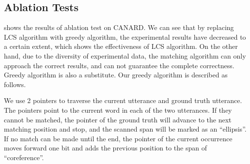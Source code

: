 \subsection{Ablation Tests}
\label{sec:ablation}

\begin{table}[ht!]
\setlength\tabcolsep{3pt}
\centering
\scriptsize
\caption{
Ablation test on CANARD. ``w/o LCS'' means replace LCS algorithm with a greedy algorithm. ``w/o split'' and ``w/o hint'' respectively represent removing the 2 kinds of optimizations in .}
\label{tab:ablation}
\end{table}

 shows the results of ablation test on CANARD. We can see that by replacing LCS algorithm with greedy algorithm, the experimental results have decreased to a certain extent, which shows the effectiveness of LCS algorithm. On the other hand, due to the diversity of experimental data, the matching algorithm can only approach the correct results, and can not guarantee the complete correctness. Greedy algorithm is also a substitute. Our greedy algorithm is described as follows.

We use 2 pointers to traverse the current utterance and ground truth utterance. The pointers point to the current word in each of the two utterances. If they cannot be matched, the pointer of the ground truth will advance to the next matching position and stop, and the scanned span will be marked as an ``ellipsis''. If no match can be made until the end, the pointer of the current occurrence moves forward one bit and adds the previous position to the span of ``coreference''.

